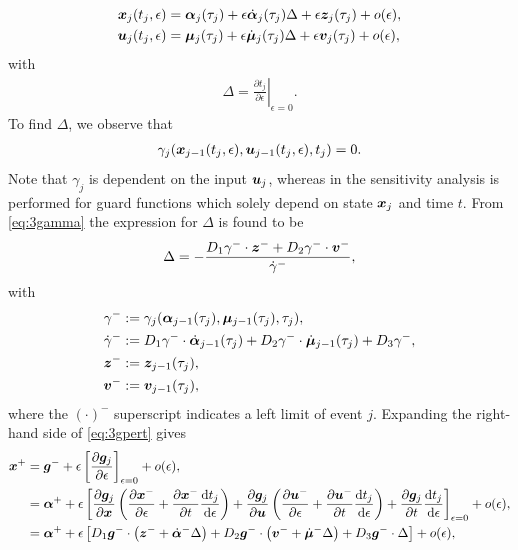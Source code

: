 \documentclass[../DC2017114Bouma.tex]{subfiles}
\begin{document}
\begin{align}
{\boldsymbol{x}}_j(t_{j},\epsilon) &= \boldsymbol{\alpha}_j(\tau_j) + \epsilon\dot{\boldsymbol{\alpha}}_j(\tau_j)\Delta + \epsilon{\boldsymbol{z}}_j(\tau_j) + o(\epsilon),\label{eq:3xexpand2}\\
{\boldsymbol{u}}_j(t_{j},\epsilon) &= \boldsymbol{\mu}_j(\tau_j) + \epsilon\dot{\boldsymbol{\mu}}_j(\tau_j)\Delta + \epsilon{\boldsymbol{v}}_j(\tau_j) + o(\epsilon),\label{eq:3uexpand2}
\end{align}
with
\begin{align}
\Delta = \left.\frac{\partial t_{j}}{\partial\epsilon}\right|_{\epsilon=0}.\label{eq:3Delta}
\end{align}
To find $\Delta$, we observe that
\begin{align}
\gamma_j({\boldsymbol{x}}_{j-1}(t_{j},\epsilon),{\boldsymbol{u}}_{j-1}(t_{j},\epsilon),t_{j}) = 0.\label{eq:3gamma}
\end{align}
Note that $\gamma_j$ is dependent on the input ${\boldsymbol{u}}_j$, whereas in \cite{Chen2018a} the sensitivity analysis is performed for guard functions which solely depend on state ${\boldsymbol{x}}_j$ and time $t$. From \eqref{eq:3gamma} the expression for $\Delta$ is found to be
\begin{align}
\Delta = -\frac{D_1\gamma^{-}\cdot{\boldsymbol{z}}^- + D_2\gamma^{-}\cdot{\boldsymbol{v}}^-}{\dot{\gamma}^{-}},\label{eq:3Deltaj}
\end{align}
with
\begin{align*}
\gamma^- &:= \gamma_j(\boldsymbol{\alpha}_{j-1}(\tau_j),\boldsymbol{\mu}_{j-1}(\tau_j),\tau_j),\\
\dot{\gamma}^- &:= D_1\gamma^-\cdot\dot{\boldsymbol{\alpha}}_{j-1}(\tau_j) + D_2\gamma^-\cdot\dot{\boldsymbol{\mu}}_{j-1}(\tau_j) + D_3\gamma^-,\\
{\boldsymbol{z}}^- &:= {\boldsymbol{z}}_{j-1}(\tau_j),\\
{\boldsymbol{v}}^- &:= {\boldsymbol{v}}_{j-1}(\tau_j),
\end{align*}
where the $(\cdot)^-$ superscript indicates a left limit of event $j$. Expanding the right-hand side of \eqref{eq:3gpert} gives
\begin{align}
{\boldsymbol{x}}^+ &= {\boldsymbol{g}}^- + \epsilon\left[\frac{\partial{\boldsymbol{g}}_j}{\partial\epsilon}\right]_{\epsilon=0} + o(\epsilon),\\
&= \boldsymbol{\alpha}^+ + \epsilon\left[\frac{\partial{\boldsymbol{g}}_j}{\partial{\boldsymbol{x}}}\left(\frac{\partial{\boldsymbol{x}}^-}{\partial\epsilon} + \frac{\partial{\boldsymbol{x}}^-}{\partial t}\frac{\text{d}t_j}{\text{d}\epsilon} \right) + \frac{\partial{\boldsymbol{g}}_j}{\partial{\boldsymbol{u}}}\left(\frac{\partial{\boldsymbol{u}}^-}{\partial\epsilon} + \frac{\partial{\boldsymbol{u}}^-}{\partial t}\frac{\text{d} t_j}{\text{d}\epsilon}\right) + \frac{\partial{\boldsymbol{g}}_j}{\partial t}\frac{\text{d} t_j}{\text{d}\epsilon} \right]_{\epsilon = 0} + o(\epsilon),\\
&= \boldsymbol{\alpha}^+ + \epsilon\left[D_1{\boldsymbol{g}}^-\cdot \left({\boldsymbol{z}}^- + \dot{\boldsymbol{\alpha}}^-\Delta\right) + D_2{\boldsymbol{g}}^-\cdot \left({\boldsymbol{v}}^- + \dot{\boldsymbol{\mu}}^- \Delta\right) + D_3{\boldsymbol{g}}^-\cdot \Delta\right] + o(\epsilon),\label{eq:3gexp}
\end{align}
\end{document}
